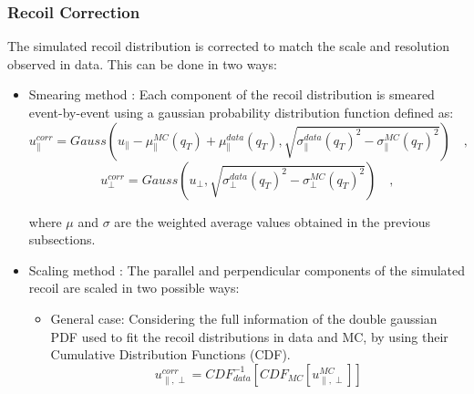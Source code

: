 \subsubsection{Recoil Correction}\label{sec:WBoson_Corrections_MET_RecoilCorr}

The simulated recoil distribution is corrected to match the scale and resolution observed in data. This can be done in two ways:

  \begin{itemize}
  \item Smearing method : Each component of the recoil distribution is smeared event-by-event using a gaussian probability distribution function defined as:
    \begin{equation}\label{eq:eqreccornsmrupar} 
        u^{corr}_{\parallel} = Gauss(u_{\parallel} - \mu_{\parallel}^{MC}(q_{T}) + \mu_{\parallel}^{data}(q_{T}), \sqrt{{\sigma_{\parallel}^{data}(q_{T})}^{2} - {\sigma_{\parallel}^{MC}(q_{T})}^{2}}) \quad,
    \end{equation}
    \begin{equation}\label{eq:eqreccornsmruperp} 
        u^{corr}_{\perp} = Gauss(u_{\perp}, \sqrt{{\sigma_{\perp}^{data}(q_{T})}^{2} - {\sigma_{\perp}^{MC}(q_{T})}^{2}}) \quad,
    \end{equation}
    
    where $\mu$ and $\sigma$ are the weighted average values obtained in the previous subsections.
    
    \item Scaling method :  The parallel and perpendicular components of the simulated recoil are scaled in two possible ways:
    
      \begin{itemize}
       \item General case: Considering the full information of the double gaussian PDF used to fit the recoil distributions in data and MC, by using their Cumulative Distribution Functions (CDF).
       \begin{equation}\label{eq:eqRecCorrGeneralCase} 
         u^{corr}_{\parallel, \perp} = CDF^{-1}_{data}[CDF_{MC}[u_{\parallel, \perp}^{MC}]]
       \end{equation}
       

\end{itemize}
\end{itemize}
